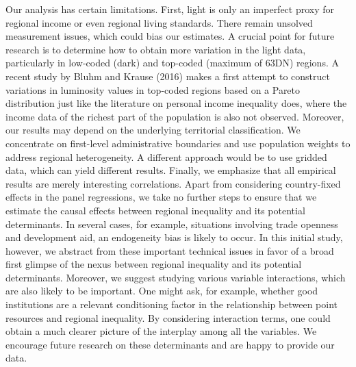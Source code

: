 \documentclass[10pt]{article}
\begin{document}
Our analysis has certain limitations. 
First, light is only an imperfect proxy for regional income or even regional living standards. 
There remain unsolved measurement issues, which could bias our estimates. 
A crucial point for future research is to determine how to obtain more variation in the light data, particularly in low-coded (dark) and top-coded (maximum of 63DN) regions. 
A recent study by Bluhm and Krause (2016) makes a first attempt to construct variations in luminosity values in top-coded regions based on a Pareto distribution just like the literature on personal income inequality does, where the income data of the richest part of the population is also not observed. 
Moreover, our results may depend on the underlying territorial classification. 
We concentrate on first-level administrative boundaries and use population weights to address regional heterogeneity. 
A different approach would be to use gridded data, which can yield different results. 
Finally, we emphasize that all empirical results are merely interesting correlations. 
Apart from considering country-fixed effects in the panel regressions, we take no further steps to ensure that we estimate the causal effects between regional inequality and its potential determinants. 
In several cases, for example, situations involving trade openness and development aid, an endogeneity bias is likely to occur. 
In this initial study, however, we abstract from these important technical issues in favor of a broad first glimpse of the nexus between regional inequality and its potential determinants. 
Moreover, we suggest studying various variable interactions, which are also likely to be important. 
One might ask, for example, whether good institutions are a relevant conditioning factor in the relationship between point resources and regional inequality. 
By considering interaction terms, one could obtain a much clearer picture of the interplay among all the variables.
We encourage future research on these determinants and are happy to provide our data. 
\end{document}

